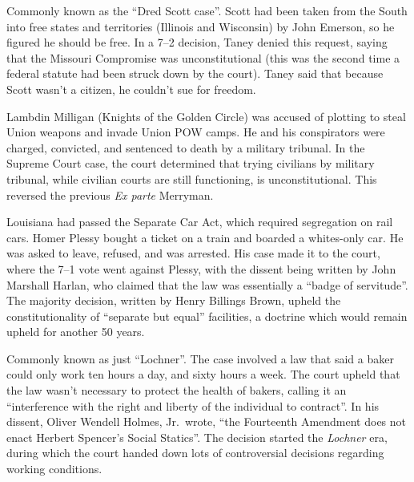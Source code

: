 
Commonly known as the ``Dred Scott case''.
Scott had been taken from the South into free states and territories (Illinois and Wisconsin) by John Emerson,
so he figured he should be free.
In a 7--2 decision, Taney denied this request, saying that the Missouri Compromise was unconstitutional
(this was the second time a federal statute had been struck down by the court).
Taney said that because Scott wasn't a citizen, he couldn't sue for freedom.


Lambdin Milligan (Knights of the Golden Circle) was accused of plotting to steal Union weapons
and invade Union POW camps.
He and his conspirators were charged, convicted, and sentenced to death by a military tribunal.
In the Supreme Court case, the court determined that trying civilians by military tribunal,
while civilian courts are still functioning, is unconstitutional.
This reversed the previous \textit{Ex parte} Merryman.


Louisiana had passed the Separate Car Act, which required segregation on rail cars.
Homer Plessy bought a ticket on a train and boarded a whites-only car.
He was asked to leave, refused, and was arrested.
His case made it to the court, where the 7--1 vote went against Plessy,
with the dissent being written by John Marshall Harlan,
who claimed that the law was essentially a ``badge of servitude''.
The majority decision, written by Henry Billings Brown,
upheld the constitutionality of ``separate but equal'' facilities,
a doctrine which would remain upheld for another 50 years.


Commonly known as just ``Lochner''.
The case involved a law that said a baker could only work ten hours a day, and sixty hours a week.
The court upheld that the law wasn't necessary to protect the health of bakers,
calling it an ``interference with the right and liberty of the individual to contract''.
In his dissent, Oliver Wendell Holmes, Jr.\ wrote,
``the Fourteenth Amendment does not enact Herbert Spencer's Social Statics''.
The decision started the \textit{Lochner} era,
during which the court handed down lots of controversial decisions regarding working conditions.


